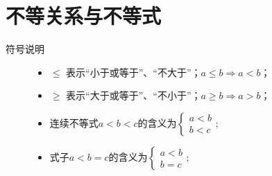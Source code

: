\Topic{}
  \Teach{}

  \newtheorem*{Theorem}{定理}
  \makefront
\vspace{-1.5em}
\startexercise
\section{不等关系与不等式}
  \begin{description}
    \item [符号说明]
      \begin{itemize}[leftmargin=*]
        \item $\leqslant$ 表示“小于或等于”、“不大于”；$a\leqslant b\Rightarrow a<b$；
        \item $\geqslant$ 表示“大于或等于”、“不小于”；$a\geqslant b\Rightarrow a>b$；
        \item 连续不等式$a<b<c$的含义为$\begin{cases}a<b\\b<c\end{cases}$;
        \item 式子$a<b=c$的含义为$\begin{cases}a<b\\b=c\end{cases}$;
      \end{itemize}
  \end{description}
